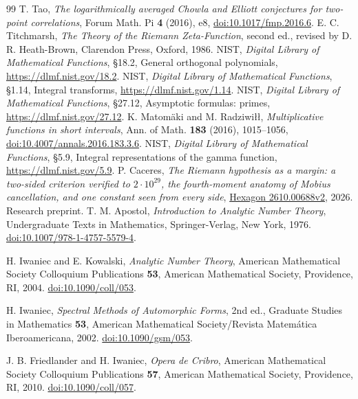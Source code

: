 \documentclass[11pt]{amsart}
\theoremstyle{definition}
\theoremstyle{remark}
\numberwithin{equation}{section}
\begin{document}
\begin{thebibliography}{99}
 T. Tao, \emph{The logarithmically averaged Chowla and Elliott conjectures for two-point correlations}, Forum Math. Pi \textbf{4} (2016), e8, \href{https://doi.org/10.1017/fmp.2016.6}{doi:10.1017/fmp.2016.6}.
 E. C. Titchmarsh, \emph{The Theory of the Riemann Zeta-Function}, second ed., revised by D. R. Heath-Brown, Clarendon Press, Oxford, 1986.
 NIST, \emph{Digital Library of Mathematical Functions}, \S18.2, General orthogonal polynomials, \url{https://dlmf.nist.gov/18.2}.
 NIST, \emph{Digital Library of Mathematical Functions}, \S1.14, Integral transforms, \url{https://dlmf.nist.gov/1.14}.
 NIST, \emph{Digital Library of Mathematical Functions}, \S27.12, Asymptotic formulas: primes, \url{https://dlmf.nist.gov/27.12}.
 K. Matom\"aki and M. Radziwi\l\l, \emph{Multiplicative functions in short intervals}, Ann. of Math. \textbf{183} (2016), 1015--1056, \href{https://doi.org/10.4007/annals.2016.183.3.6}{doi:10.4007/annals.2016.183.3.6}.
 NIST, \emph{Digital Library of Mathematical Functions}, \S5.9, Integral representations of the gamma function, \url{https://dlmf.nist.gov/5.9}.
 P. Caceres, \emph{The Riemann hypothesis as a margin: a two-sided criterion verified to \(2\cdot10^{29}\), the fourth-moment anatomy of Mobius cancellation, and one constant seen from every side}, \href{https://hexagonmath.org/2610.00688v2}{Hexagon 2610.00688v2}, 2026. Research preprint.
T. M. Apostol, \emph{Introduction to Analytic Number Theory},
Undergraduate Texts in Mathematics, Springer-Verlag, New York, 1976.
\href{https://doi.org/10.1007/978-1-4757-5579-4}{doi:10.1007/978-1-4757-5579-4}.

H. Iwaniec and E. Kowalski, \emph{Analytic Number Theory},
American Mathematical Society Colloquium Publications \textbf{53},
American Mathematical Society, Providence, RI, 2004.
\href{https://doi.org/10.1090/coll/053}{doi:10.1090/coll/053}.

H. Iwaniec, \emph{Spectral Methods of Automorphic Forms}, 2nd ed.,
Graduate Studies in Mathematics \textbf{53},
American Mathematical Society/Revista Matem\'atica Iberoamericana, 2002.
\href{https://doi.org/10.1090/gsm/053}{doi:10.1090/gsm/053}.

J. B. Friedlander and H. Iwaniec, \emph{Opera de Cribro},
American Mathematical Society Colloquium Publications \textbf{57},
American Mathematical Society, Providence, RI, 2010.
\href{https://doi.org/10.1090/coll/057}{doi:10.1090/coll/057}.


\end{thebibliography}
\end{document}
